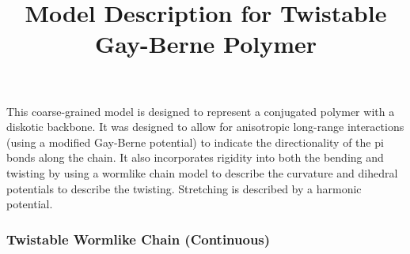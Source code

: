 \documentclass[11pt]{article}
\begin{document}
\title{\vspace{-40pt} \large Model Description for Twistable Gay-Berne Polymer}
\date{}
\maketitle
\vspace{-40pt}
\singlespacing
{}
This coarse-grained model is designed to represent a conjugated polymer with a diskotic backbone. It was designed to allow for anisotropic long-range interactions (using a modified Gay-Berne potential) to indicate the directionality of the pi bonds along the chain. It also incorporates rigidity into both the bending and twisting by using a wormlike chain model to describe the curvature and dihedral potentials to describe the twisting. Stretching is described by a harmonic potential. 

\subsubsection*{Twistable Wormlike Chain (Continuous)}
\end{document}
